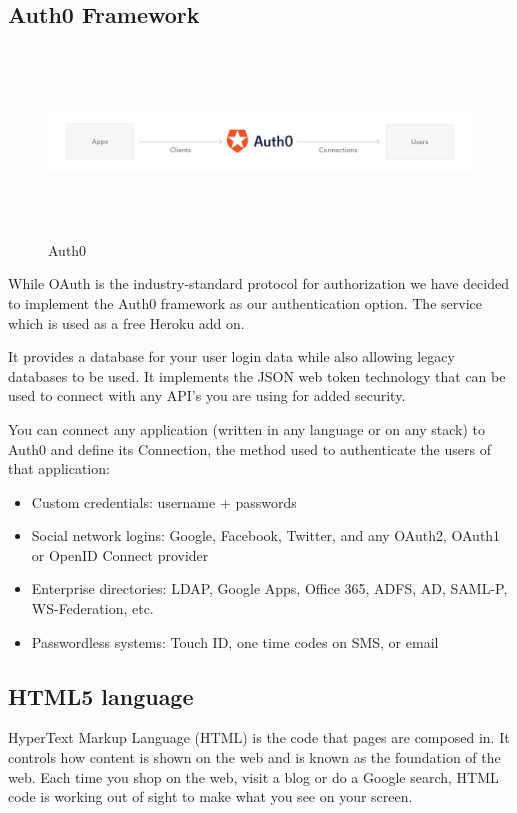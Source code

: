 \subsection{Auth0 Framework}
\begin{figure} 
      \caption{Auth0 \cite{auth0}}
      \centering
      \includegraphics[width=13.5cm, height=5cm]{img/auth0.png}
\end{figure}
While OAuth is the industry-standard protocol for authorization we have decided to implement the Auth0 framework as our authentication option. The service which is used as a free Heroku add on.

It provides a database for your user login data while also allowing legacy databases to be used. It implements the JSON web token technology that can be used to connect with any API's you are using for added security.



You can connect any application (written in any language or on any stack) to Auth0 and define its Connection, the method used to authenticate the users of that application:\cite{auth0}
\begin{itemize}
\item Custom credentials: username + passwords \cite{auth0}
\item Social network logins: Google, Facebook, Twitter, and any OAuth2,  OAuth1 or OpenID Connect provider \cite{auth0}
\item Enterprise directories: LDAP, Google Apps, Office 365, ADFS, AD, SAML-P, WS-Federation, etc. \cite{auth0}
\item Passwordless systems: Touch ID, one time codes on SMS, or email \cite{auth0}
\end{itemize}

\subsection{HTML5 language}
HyperText Markup Language (HTML) is the code that pages are composed in.\cite{html2} It controls how content is shown on the web and is known as the foundation of the web. Each time you shop on the web, visit a blog or do a Google search, HTML code is working out of sight to make what you see on your screen.\cite{html2}

